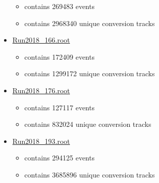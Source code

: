 \documentclass[10pt]{beamer}
\begin{document}
\begin{frame}
\begin{columns}
\begin{column}{0.5\textwidth}
\begin{itemize}
        \begin{itemize}
        \scriptsize
      		\item   contains 269483 events
      		\item   contains 2968340 unique conversion tracks       
        \end{itemize}
   \item \url{Run2018_166.root}
        \begin{itemize}
        \scriptsize
      		 \item  contains 172409 events
       		\item  contains 1299172 unique conversion tracks
        \end{itemize}

    \item \url{Run2018_176.root}
        \begin{itemize}
        \scriptsize
      		\item   contains 127117 events
      		\item   contains 832024 unique conversion tracks
        \end{itemize}
    \item \url{Run2018_193.root}
        \begin{itemize}
        \scriptsize
      		 \item  contains 294125 events
       		\item  contains 3685896 unique conversion tracks 
        \end{itemize}
\end{itemize}
\end{column}
\end{columns}

\end{frame}
\end{document}

